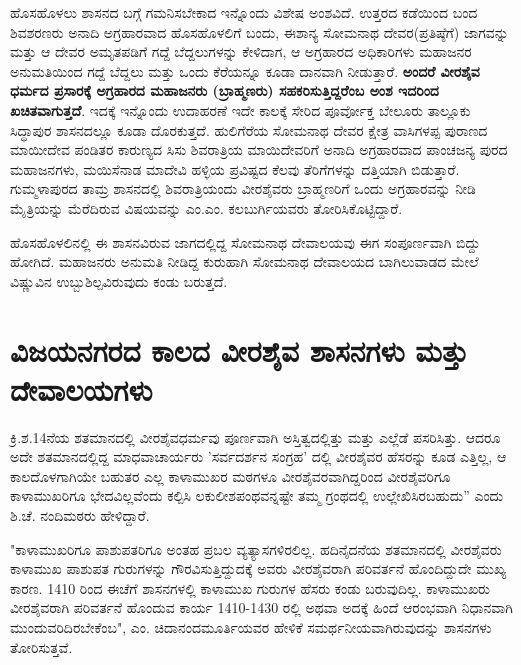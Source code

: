 ಹೊಸಹೊಳಲು ಶಾಸನದ ಬಗ್ಗೆ ಗಮನಿಸಬೇಕಾದ ಇನ್ನೊಂದು ವಿಶೇಷ ಅಂಶವಿದೆ. ಉತ್ತರದ ಕಡೆಯಿಂದ ಬಂದ ಶಿವಶರಣರು ಅನಾದಿ ಅಗ್ರಹಾರವಾದ ಹೊಸಹೊಳಲಿಗೆ ಬಂದು, ಈಶಾನ್ಯ ಸೋಮನಾಥ ದೇವರ(ಪ್ರತಿಷ್ಠೆಗೆ) ಜಾಗವನ್ನು ಮತ್ತು ಆ ದೇವರ ಅಮೃತಪಡಿಗೆ ಗದ್ದೆ ಬೆದ್ದಲುಗಳನ್ನು ಕೇಳಿದಾಗ, ಆ ಅಗ್ರಹಾರದ ಅಧಿಕಾರಿಗಳು ಮಹಾಜನರ ಅನುಮತಿಯಿಂದ ಗದ್ದೆ ಬೆದ್ದಲು ಮತ್ತು ಒಂದು ಕೆರೆಯನ್ನೂ ಕೂಡಾ ದಾನವಾಗಿ ನೀಡುತ್ತಾರೆ. \textbf{ಅಂದರೆ ವೀರಶೈವ ಧರ್ಮದ ಪ್ರಸಾರಕ್ಕೆ ಅಗ್ರಹಾರದ ಮಹಾಜನರು (ಬ್ರಾಹ್ಮಣರು) ಸಹಕರಿಸುತ್ತಿದ್ದರೆಂಬ ಅಂಶ ಇದರಿಂದ ಖಚಿತವಾಗುತ್ತದೆ}. ಇದಕ್ಕೆ ಇನ್ನೊಂದು ಉದಾಹರಣೆ ಇದೇ ಕಾಲಕ್ಕೆ ಸೇರಿದ ಪೂರ್ವೋಕ್ತ ಬೇಲೂರು ತಾಲ್ಲೂಕು ಸಿದ್ಧಾಪುರ ಶಾಸನದಲ್ಲೂ ಕೂಡಾ ದೊರಕುತ್ತದೆ. ಹುಲಿಗೆರೆಯ ಸೋಮನಾಥ ದೇವರ ಕ್ಷೇತ್ರ ವಾಸಿಗಳಪ್ಪ ಪುರಾಣದ ಮಾಯೀದೇವ ಪಂಡಿತರ ಕಾರುಣ್ಯದ ಸಿಸು ಶಿವರಾತ್ರಿಯ ಮಾಯಿದೇವರಿಗೆ ಅನಾದಿ ಅಗ್ರಹಾರವಾದ ಪಾಂಚಜನ್ಯ ಪುರದ ಮಹಾಜನಗಳು, ಮಯಿಸೆನಾಡ ಮಾದೇವಿ ಹಳ್ಳಿಯ ಪ್ರವಿಷ್ಟದ ಕೆಲವು ತೆರಿಗೆಗಳನ್ನು ದತ್ತಿಯಾಗಿ ಬಿಡುತ್ತಾರೆ. ಗುಮ್ಮಳಾಪುರದ ತಾಮ್ರ ಶಾಸನದಲ್ಲಿ ಶಿವರಾತ್ರಿಯಂದು ವೀರಶೈವರು ಬ್ರಾಹ್ಮಣರಿಗೆ ಒಂದು ಅಗ್ರಹಾರವನ್ನು ನೀಡಿ ಮೈತ್ರಿಯನ್ನು ಮೆರೆದಿರುವ ವಿಷಯವನ್ನು ಎಂ.ಎಂ. ಕಲಬುರ್ಗಿಯವರು ತೋರಿಸಿಕೊಟ್ಟಿದ್ದಾರೆ.

ಹೊಸಹೊಳಲಿನಲ್ಲಿ ಈ ಶಾಸನವಿರುವ ಜಾಗದಲ್ಲಿದ್ದ ಸೋಮನಾಥ ದೇವಾಲಯವು ಈಗ ಸಂಪೂರ್ಣವಾಗಿ ಬಿದ್ದು ಹೋಗಿದೆ. ಮಹಾಜನರು ಅನುಮತಿ ನೀಡಿದ್ದ ಕುರುಹಾಗಿ ಸೋಮನಾಥ ದೇವಾಲಯದ ಬಾಗಿಲುವಾಡದ ಮೇಲೆ ವಿಷ್ಣುವಿನ ಉಬ್ಬುಶಿಲ್ಪವಿರುವುದು ಕಂಡು ಬರುತ್ತದೆ.

\section*{ವಿಜಯನಗರದ ಕಾಲದ ವೀರಶೈವ ಶಾಸನಗಳು ಮತ್ತು ದೇವಾಲಯಗಳು}

ಕ್ರಿ.ಶ.14ನೆಯ ಶತಮಾನದಲ್ಲಿ ವೀರಶೈವಧರ್ಮವು ಪೂರ್ಣವಾಗಿ ಅಸ್ತಿತ್ವದಲ್ಲಿತ್ತು ಮತ್ತು ಎಲ್ಲೆಡೆ ಪಸರಿಸಿತ್ತು. ಆದರೂ ಅದೇ ಶತಮಾನದಲ್ಲಿದ್ದ ಮಾಧವಾಚಾರ್ಯರು ’ಸರ್ವದರ್ಶನ ಸಂಗ್ರಹ’ ದಲ್ಲಿ ವೀರಶೈವರ ಹೆಸರನ್ನು ಕೂಡ ಎತ್ತಿಲ್ಲ, ಆ ಕಾಲದೊಳಗಾಗಿಯೇ ಬಹುತರ ಎಲ್ಲ ಕಾಳಾಮುಖರ ಮಠಗಳೂ ವೀರಶೈವರವಾಗಿದ್ದರಿಂದ ವೀರಶೈವರಿಗೂ ಕಾಳಾಮುಖರಿಗೂ ಭೇದವಿಲ್ಲವೆಂದು ಕಲ್ಪಿಸಿ ಲಕುಲೀಶಪಂಥವನ್ನಷ್ಟೇ ತಮ್ಮ ಗ್ರಂಥದಲ್ಲಿ ಉಲ್ಲೇಖಿಸಿರಬಹುದು” ಎಂದು ಶಿ.ಚೆ. ನಂದಿಮಠರು ಹೇಳಿದ್ದಾರೆ.

"ಕಾಳಾಮುಖರಿಗೂ ಪಾಶುಪತರಿಗೂ ಅಂತಹ ಪ್ರಬಲ ವ್ಯತ್ಯಾಸಗಳಿರಲಿಲ್ಲ. ಹದಿನೈದನೆಯ ಶತಮಾನದಲ್ಲಿ ವೀರಶೈವರು ಕಾಳಾಮುಖ ಪಾಶುಪತ ಗುರುಗಳನ್ನು ಗೌರವಿಸುತ್ತಿದ್ದುದಕ್ಕೆ ಅವರು ವೀರಶೈವರಾಗಿ ಪರಿವರ್ತನೆ ಹೊಂದಿದ್ದುದೇ ಮುಖ್ಯ ಕಾರಣ. 1410 ರಿಂದ ಈಚೆಗೆ ಶಾಸನಗಳಲ್ಲಿ ಕಾಳಾಮುಖ ಗುರುಗಳ ಹೆಸರು ಕಂಡು ಬರುವುದಿಲ್ಲ. ಕಾಳಾಮುಖರು ವೀರಶೈವರಾಗಿ ಪರಿವರ್ತನೆ ಹೊಂದುವ ಕಾರ್ಯ 1410-1430 ರಲ್ಲಿ ಅಥವಾ ಅದಕ್ಕೆ ಹಿಂದೆ ಆರಂಭವಾಗಿ ನಿಧಾನವಾಗಿ ಮುಂದುವರಿದಿರಬೇಕೆಂಬ", ಎಂ. ಚಿದಾನಂದಮೂರ್ತಿಯವರ ಹೇಳಿಕೆ ಸಮರ್ಥನೀಯವಾಗಿರುವುದನ್ನು ಶಾಸನಗಳು ತೋರಿಸುತ್ತವೆ.

